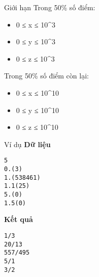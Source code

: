 Giới hạn
Trong 50\% số điểm:  
\begin{itemize}
	\item     0 ≤ x ≤ 10^3   
	\item     0 ≤ y ≤ 10^3   
	\item     0 ≤ z ≤ 10^3   
\end{itemize}

   Trong 50\% số điểm còn lại:  
\begin{itemize}
	\item     0 ≤ x ≤ 10^10   
	\item     0 ≤ y ≤ 10^10   
	\item     0 ≤ z ≤ 10^10   
\end{itemize}
Ví dụ
\textbf{    Dữ liệu   }
\begin{verbatim}
5
0.(3)
1.(538461)
1.1(25)
5.(0)
1.5(0)
\end{verbatim}

\textbf{    Kết quả   }
\begin{verbatim}
1/3
20/13
557/495
5/1
3/2
\end{verbatim}